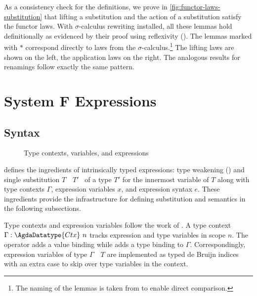 \documentclass[manuscript,screen,review,anonymous,acmsmall]{acmart}
\begin{document}
As a consistency check for the definitions, we prove in \cref{fig:functor-laws-substitution}
that lifting a substitution and the action of a substitution satisfy
the functor laws. With $\sigma$-calculus rewriting installed, all these lemmas 
hold definitionally as evidenced by their proof using reflexivity
(). The lemmas marked with $*$ correspond directly to laws from the
$\sigma$-calculus.\footnote{The naming of the lemmas is taken from
  \citet{10.1007/978-3-030-33636-3_10} to enable direct comparison.}
The lifting laws are shown on the left, the application laws on the right.
The analogous results for renamings follow exactly the same pattern.



\section{System F Expressions}
\label{sec:system-f-expressions}
\subsection{Syntax}
\label{sec:expressions}

\begin{figure}[tp]
  \begin{minipage}[t]{0.49\linewidth}
  \SFTypeWeaken
  \SFTypeSubzero
  \SFTypeCtx
  \SFTypeVar
  \end{minipage}
  \begin{minipage}[t]{0.49\linewidth}
    \SFExprDefinition
  \end{minipage}
  \caption{Type contexts, variables, and expressions}
  \label{fig:system-f-expressions}
\end{figure}


 defines the ingredients of intrinsically typed expressions:
type weakening () and 
single substitution $T$~\AgdaFunction{[}~$T′$~\AgdaFunction{]*} of a type $T'$ for the
innermost variable of $T$ along with type contexts $\Gamma$, expression
variables $x$, and expression syntax $e$. These ingredients provide the infrastructure for defining
substitution and semantics in the following subsections.

Type contexts and expression variables follow the work of
\citet{10.1007/978-3-030-33636-3_10}. A type context $\Gamma : \AgdaDatatype{Ctx}~n$
tracks expression and type
variables in scope $n$. The operator
 adds a
value binding while
 adds a type
binding to $\Gamma$. Correspondingly, expression variables of type
$\Gamma$~\AgdaFunction{$\ni$}~$T$ are implemented as typed de Bruijn
indices with an extra case  to skip
over type variables in the context.
\end{document}
